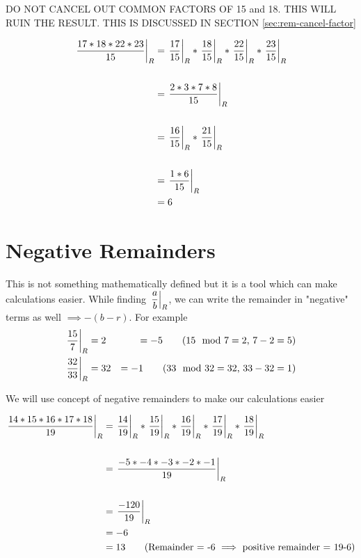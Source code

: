 
\begin{WARNING}
    DO NOT CANCEL OUT COMMON FACTORS OF 15 and 18. THIS WILL RUIN THE RESULT. THIS IS DISCUSSED IN SECTION \ref{sec:rem-cancel-factor}
\end{WARNING}

\begin{align*}
    \remFrac{17 * 18 * 22 * 23}{15} &= \remFrac{17}{15} * \remFrac{18}{15} * \remFrac{22}{15} * \remFrac{23}{15} \\ \\
    &= \remFrac{2 * 3 * 7 * 8}{15} \\ \\
    &= \remFrac{16}{15} * \remFrac{21}{15} \\ \\
    &= \remFrac{1 * 6}{15} \\
    &= 6
\end{align*}

\section{Negative Remainders}

This is not something mathematically defined but it is a tool which can make calculations easier. While finding $\remFrac{a}{b}$, we can write the remainder in "negative" terms as well $\implies -(b - r)$. For example
\begin{align*}
    \remFrac{15}{7} &= 2 &= -5 \tag{$15 \mod 7 = 2$, $7-2 = 5$} \\
    \remFrac{32}{33} &= 32 &= -1 \tag{$33 \mod 32 = 32$, $33-32 = 1$} \\
\end{align*}


We will use concept of negative remainders to make our calculations easier

\begin{align*}
    \remFrac{14 * 15 * 16 * 17 * 18}{19} &= \remFrac{14}{19} * \remFrac{15}{19} * \remFrac{16}{19} * \remFrac{17}{19} * \remFrac{18}{19} \\ \\
    &= \remFrac{-5 * -4 * -3 * -2 * -1}{19} \\ \\
    &= \remFrac{-120}{19} \\
    &= -6 \\
    &= 13 \tag{Remainder = -6 $\implies$ positive remainder = 19-6}
\end{align*}

